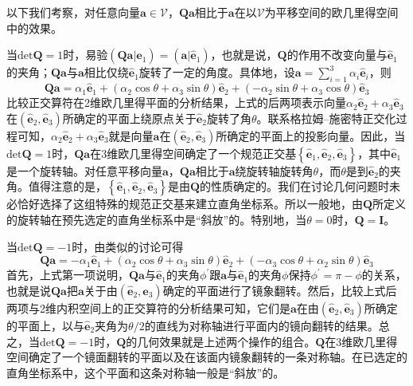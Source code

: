 \documentclass[main.tex]{subfiles}
\begin{document}
以下我们考察，对任意向量$\mathbf{a}\in\mathcal{V}$，$\mathbf{Qa}$相比于$\mathbf{a}$在以$\mathcal{V}$为平移空间的欧几里得空间中的效果。

当$\mathrm{det}\mathbf{Q}=1$时，易验$\left(\mathbf{Qa}|\mathbf{\hat{e}}_1\right)=\left(\mathbf{a}|\mathbf{\hat{e}}_1\right)$，也就是说，$\mathbf{Q}$的作用不改变向量与$\mathbf{\hat{e}}_1$的夹角；$\mathbf{Qa}$与$\mathbf{a}$相比仅绕$\mathbf{\hat{e}}_1$旋转了一定的角度。具体地，设$\mathbf{a}=\sum_{i=1}^3\alpha_i\mathbf{\hat{e}}_i$，则
\[\mathbf{Qa}=\alpha_1\mathbf{\hat{e}}_1+\left(\alpha_2\cos\theta+\alpha_3\sin\theta\right)\mathbf{\hat{e}}_2+\left(-\alpha_2\sin\theta+\alpha_3\cos\theta\right)\mathbf{\hat{e}}_3\]
比较正交算符在2维欧几里得平面的分析结果，上式的后两项表示向量$\alpha_2\mathbf{\hat{e}}_2+\alpha_3\mathbf{\hat{e}}_3$在$\left(\mathbf{\hat{e}}_2,\mathbf{\hat{e}}_3\right)$所确定的平面上绕原点关于$\mathbf{\hat{e}}_2$旋转了角$\theta$。联系格拉姆--施密特正交化过程可知，$\alpha_2\mathbf{\hat{e}}_2+\alpha_3\mathbf{\hat{e}}_3$就是向量$\mathbf{a}$在$\left(\mathbf{\hat{e}}_2,\mathbf{\hat{e}}_3\right)$所确定的平面上的投影向量。因此，当$\mathrm{det}\mathbf{Q}=1$时，$\mathbf{Qa}$在3维欧几里得空间确定了一个规范正交基$\left\{\mathbf{\hat{e}}_1,\mathbf{\hat{e}}_2,\mathbf{\hat{e}}_3\right\}$，其中$\mathbf{\hat{e}}_1$是一个旋转轴。对任意平移向量$\mathbf{a}$，$\mathbf{Qa}$相比于$\mathbf{a}$绕旋转轴旋转角$\theta$，而$\theta$是到$\mathbf{\hat{e}}_2$的夹角。值得注意的是，$\left\{\mathbf{\hat{e}}_1,\mathbf{\hat{e}}_2,\mathbf{\hat{e}}_3\right\}$是由$\mathbf{Q}$的性质确定的。我们在讨论几何问题时未必恰好选择了这组特殊的规范正交基来建立直角坐标系。所以一般地，由$\mathbf{Q}$所定义的旋转轴在预先选定的直角坐标系中是“斜放”的。特别地，当$\theta=0$时，$\mathbf{Q}=\mathbf{I}$。

当$\mathrm{det}\mathbf{Q}=-1$时，由类似的讨论可得
\[\mathbf{Qa}=-\alpha_1\mathbf{\hat{e}}_1+\left(\alpha_2\cos\theta+\alpha_3\sin\theta\right)\mathbf{\hat{e}}_2+\left(-\alpha_3\cos\theta+\alpha_2\sin\theta\right)\mathbf{\hat{e}}_3\]
首先，上式第一项说明，$\mathbf{Qa}$与$\mathbf{\hat{e}}_1$的夹角$\phi^\prime$跟$\mathbf{a}$与$\mathbf{\hat{e}}_1$的夹角$\phi$保持$\phi^\prime=\pi-\phi$的关系，也就是说$\mathbf{Qa}$把$\mathbf{a}$关于由$\left(\mathbf{\hat{e}}_2,\mathbf{\hat{e}}_3\right)$确定的平面进行了镜象翻转。然后，比较上式后两项与2维内积空间上的正交算符的分析结果可知，它们是$\mathbf{a}$在由$\left(\mathbf{\hat{e}}_2,\mathbf{\hat{e}}_3\right)$所确定的平面上，以与$\mathbf{\hat{e}}_2$夹角为$\theta/2$的直线为对称轴进行平面内的镜向翻转的结果。总之，当$\mathrm{det}\mathbf{Q}=-1$时，$\mathbf{Q}$的几何效果就是上述两个操作的组合。$\mathbf{Q}$在3维欧几里得空间确定了一个镜面翻转的平面以及在该面内镜象翻转的一条对称轴。在已选定的直角坐标系中，这个平面和这条对称轴一般是“斜放”的。
\end{document}
